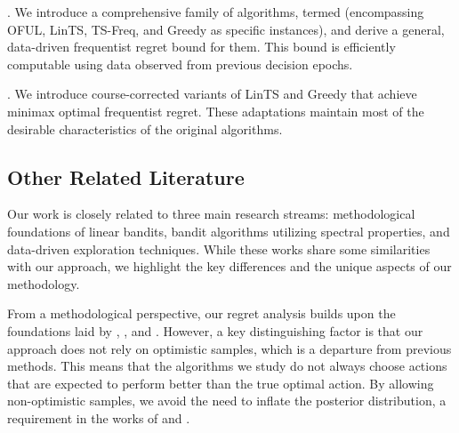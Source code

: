 .  We introduce a comprehensive family of algorithms, termed \emph{\POFUL{}} (encompassing OFUL, LinTS, TS-Freq, and Greedy as specific instances), and derive a general, data-driven frequentist regret bound for them. This bound is efficiently computable using data observed from previous decision epochs.

.   We introduce course-corrected variants of LinTS and Greedy that achieve minimax optimal frequentist regret. These adaptations maintain most of the desirable characteristics of the original algorithms.





\subsection{Other Related Literature}

Our work is closely related to three main research streams: methodological foundations of linear bandits, bandit algorithms utilizing spectral properties, and data-driven exploration techniques. While these works share some similarities with our approach, we highlight the key differences and the unique aspects of our methodology.

From a methodological perspective, our regret analysis builds upon the foundations laid by \cite{abbasi2011improved}, \cite{agrawal2013thompson}, and \cite{abeille2017linear}. However, a key distinguishing factor is that our approach does not rely on optimistic samples, which is a departure from previous methods. This means that the algorithms we study do not always choose actions that are expected to perform better than the true optimal action. By allowing non-optimistic samples, we avoid the need to inflate the posterior distribution, a requirement in the works of \cite{agrawal2013thompson} and \cite{abeille2017linear}.

